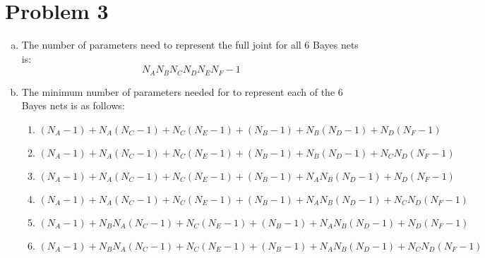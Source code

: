 \documentclass[12pt]{article}%
\begin{document}
\section*{Problem 3}
    \begin{enumerate}[a)]
        \item
            The number of parameters need to represent the full joint for all 6 Bayes nets is:
            \[N_AN_BN_CN_DN_EN_F - 1\]
        \item
            The minimum number of parameters needed for to represent each of the 6 Bayes nets is as follows:
            \begin{enumerate}[(1)]
                \item
                    \[(N_A -1) + N_A(N_C -1) + N_C(N_E -1) + (N_B -1) + N_B(N_D -1) + N_D(N_F - 1)\]
                \item
                    \[(N_A -1) + N_A(N_C -1) + N_C(N_E -1) + (N_B -1) + N_B(N_D -1) + N_CN_D(N_F - 1)\]
                \item
                    \[(N_A -1) + N_A(N_C -1) + N_C(N_E -1) + (N_B -1) + N_AN_B(N_D -1) + N_D(N_F - 1)\]
                \item
                    \[(N_A -1) + N_A(N_C -1) + N_C(N_E -1) + (N_B -1) + N_AN_B(N_D -1) + N_CN_D(N_F - 1)\]
                \item
                    \[(N_A -1) + N_BN_A(N_C -1) + N_C(N_E -1) + (N_B -1) + N_AN_B(N_D -1) + N_D(N_F - 1)\]
                \item
                    \[(N_A -1) + N_BN_A(N_C -1) + N_C(N_E -1) + (N_B -1) + N_AN_B(N_D -1) + N_CN_D(N_F - 1)\]
            \end{enumerate}
    \end{enumerate}
\end{document}
